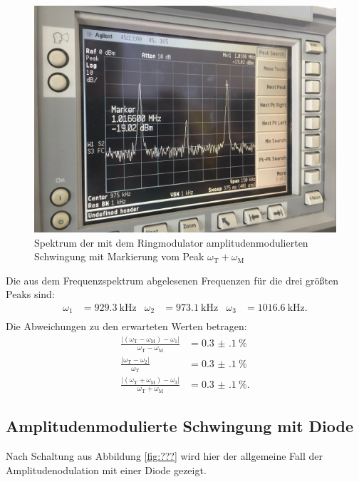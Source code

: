 \begin{figure}[H]
  \includegraphics[width=\textwidth]{Spektrum_Pics/b3.jpg}
  \caption{Spektrum der mit dem Ringmodulator amplitudenmodulierten Schwingung mit Markierung vom Peak $\omega_\text{T} + \omega_\text{M}$}
  \label{fig:b3}
\end{figure}

Die aus dem Frequenzspektrum abgelesenen Frequenzen für die drei größten Peaks sind:
\begin{align*}
  \omega_1 &= \SI{929.3}{\kilo\hertz} & \omega_2 &= \SI{973.1}{\kilo\hertz} & \omega_3 &= \SI{1016.6}{\kilo\hertz}.\\
\end{align*}
Die Abweichungen zu den erwarteten Werten betragen:
\begin{align*}
  \frac{|(\omega_\text{T} - \omega_\text{M}) - \omega_1|}{\omega_\text{T} - \omega_\text{M}} &= \SI{0.3(1)}{\percent}\\
  \frac{|\omega_\text{T} - \omega_2|}{\omega_\text{T}} &= \SI{0.3(1)}{\percent}\\
  \frac{|(\omega_\text{T} + \omega_\text{M}) - \omega_3|}{\omega_\text{T} + \omega_\text{M}} &= \SI{0.3(1)}{\percent}.
\end{align*}

\subsection{Amplitudenmodulierte Schwingung mit Diode}

Nach Schaltung aus Abbildung \ref{fig:???} wird hier der allgemeine Fall der Amplitudenodulation mit einer Diode gezeigt.

